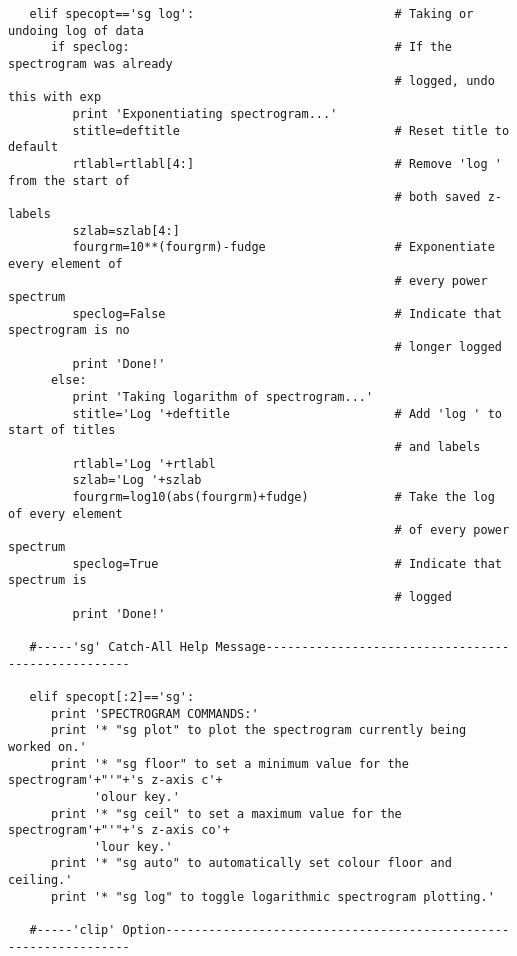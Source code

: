 \begin{verbatim}
   elif specopt=='sg log':                            # Taking or undoing log of data
      if speclog:                                     # If the spectrogram was already
                                                      # logged, undo this with exp
         print 'Exponentiating spectrogram...'
         stitle=deftitle                              # Reset title to default
         rtlabl=rtlabl[4:]                            # Remove 'log ' from the start of
                                                      # both saved z-labels
         szlab=szlab[4:]
         fourgrm=10**(fourgrm)-fudge                  # Exponentiate every element of
                                                      # every power spectrum
         speclog=False                                # Indicate that spectrogram is no
                                                      # longer logged
         print 'Done!'
      else:
         print 'Taking logarithm of spectrogram...'
         stitle='Log '+deftitle                       # Add 'log ' to start of titles
                                                      # and labels
         rtlabl='Log '+rtlabl
         szlab='Log '+szlab
         fourgrm=log10(abs(fourgrm)+fudge)            # Take the log of every element
                                                      # of every power spectrum
         speclog=True                                 # Indicate that spectrum is
                                                      # logged
         print 'Done!'

   #-----'sg' Catch-All Help Message---------------------------------------------------

   elif specopt[:2]=='sg':
      print 'SPECTROGRAM COMMANDS:'
      print '* "sg plot" to plot the spectrogram currently being worked on.'
      print '* "sg floor" to set a minimum value for the spectrogram'+"'"+'s z-axis c'+
            'olour key.'
      print '* "sg ceil" to set a maximum value for the spectrogram'+"'"+'s z-axis co'+
            'lour key.'
      print '* "sg auto" to automatically set colour floor and ceiling.'
      print '* "sg log" to toggle logarithmic spectrogram plotting.'

   #-----'clip' Option-----------------------------------------------------------------


\end{verbatim}
